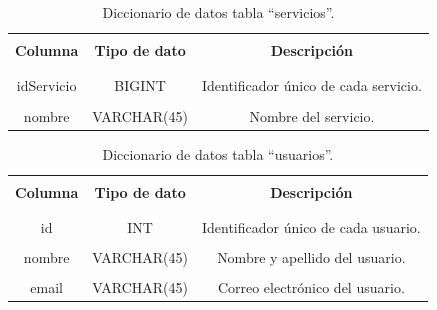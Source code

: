 \begin{spacing}{1.0}
	\begin{table}[H]
		\centering
		\caption{Diccionario de datos tabla ``servicios''.} 
		\begin{tabular}{|c|c|c|}
			\hline 
			\rowcolor{gray!30} &&\\
			\rowcolor{gray!30} \textbf{Columna} & \textbf{Tipo de dato} & \textbf{Descripción} \\ 
			\rowcolor{gray!30} &&\\
			\hline 
			&&\\[-0.2cm]
			idServicio & BIGINT & Identificador único de cada servicio. \\
			\hline 
			&&\\[-0.2cm]
			nombre & VARCHAR(45) & Nombre del servicio. \\
			\hline 
		\end{tabular}
		\label{diccionario_servicios}
	\end{table}
\end{spacing}

\begin{spacing}{1.0}
	\begin{table}[H]
		\centering
		\caption{Diccionario de datos tabla ``usuarios''.} 
		\begin{tabular}{|c|c|c|}
			\hline 
			\rowcolor{gray!30} &&\\
			\rowcolor{gray!30} \textbf{Columna} & \textbf{Tipo de dato} & \textbf{Descripción} \\ 
			\rowcolor{gray!30} &&\\
			\hline 
			&&\\[-0.2cm]
			id & INT & Identificador único de cada usuario. \\
			\hline 
			&&\\[-0.2cm]
			nombre & VARCHAR(45) & Nombre y apellido del usuario. \\
			\hline
			&&\\[-0.2cm]
			email & VARCHAR(45) & Correo electrónico del usuario. \\
			\hline 
		\end{tabular}
		\label{diccionario_usuarios}
	\end{table}
\end{spacing}

